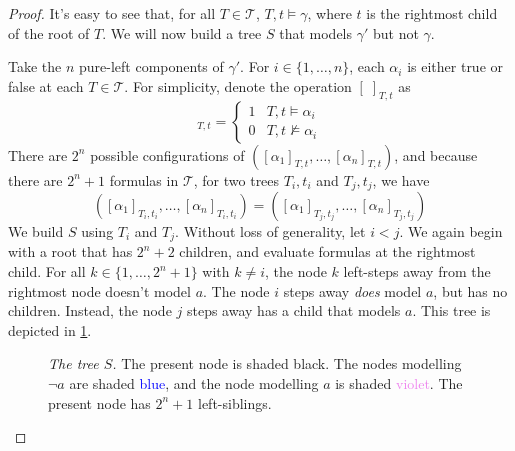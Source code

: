 \documentclass[a4paper,UKenglish,cleveref, autoref, thm-restate, numberwithinsect]{lipics-v2021}
\begin{document}
\begin{proof}
    It's easy to see that, for all $T \in \mathcal{T}$, $T, t \vDash \gamma$, where $t$ is the rightmost child of the root of $T$. We will now build a tree $S$ that models $\gamma'$ but not $\gamma$.

    Take the $n$ pure-left components of $\gamma'$. For $i \in \{1, \ldots, n\}$, each $\alpha_i$ is either true or false at each $T \in \mathcal{T}$. For simplicity, denote the operation $[\;]_{T, t}$ as
    \begin{equation*}
        [\alpha_i]_{T, t} = \begin{cases}
            1 & T, t \vDash \alpha_i\\
            0 & T, t \nvDash \alpha_i
        \end{cases}
    \end{equation*}
    There are $2^n$ possible configurations of $([\alpha_1]_{T, t}, \ldots, [\alpha_n]_{T, t})$, and because there are $2^n+1$ formulas in $\mathcal{T}$, for two trees $T_i, t_i$ and $T_j, t_j$, we have
    \begin{equation*}
        ([\alpha_1]_{T_i, t_i}, \ldots, [\alpha_n]_{T_i, t_i}) = ([\alpha_1]_{T_j, t_j}, \ldots, [\alpha_n]_{T_j, t_j})
    \end{equation*}
    We build $S$ using $T_i$ and $T_j$. Without loss of generality, let $i < j$. We again begin with a root that has $2^n + 2$ children, and evaluate formulas at the rightmost child. For all $k \in \{1, \ldots, 2^n + 1\}$ with $k \neq i$, the node $k$ left-steps away from the rightmost node doesn't model $a$. The node $i$ steps away \textit{does} model $a$, but has no children. Instead, the node $j$ steps away has a child that models $a$. This tree is depicted in \cref{fineFailureTree}.
    \begin{figure}[h]
        \centering
        \caption{\emph{The tree $S$.} The present node is shaded black. The nodes modelling $\lnot a$ are shaded \textcolor{blue}{blue}, and the node modelling $a$ is shaded \textcolor{violet}{violet}. The present node has $2^n + 1$ left-siblings.}
        \label{fineFailureTree}
    \end{figure}


\end{proof}
\end{document}
